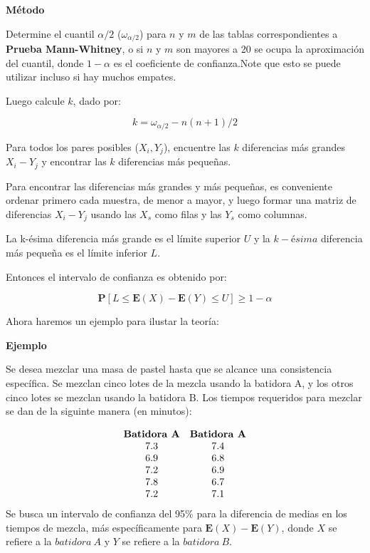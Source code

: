\documentclass[
  a4paper,
  oneside,
  openany]{book}
\begin{document}
\textbf{Método}

Determine el cuantil \(\alpha/2\) (\(\omega_{\alpha/2}\)) para \(n\) y \(m\) de las tablas correspondientes a \textbf{Prueba Mann-Whitney}, o si \(n\) y \(m\) son mayores a 20 se ocupa la aproximación del cuantil, donde \(1-\alpha\) es el coeficiente de confianza.Note que esto se puede utilizar incluso si hay muchos empates.

Luego calcule \(k\), dado por:

\[k= \omega_{\alpha/2}-n(n+1)/2\]

Para todos los pares posibles (\(X_{i},Y_{j}\)), encuentre las \(k\) diferencias más grandes \(X_{i}-Y_{j}\) y encontrar las \(k\) diferencias más pequeñas.

Para encontrar las diferencias más grandes y más pequeñas, es conveniente ordenar primero cada muestra, de menor a mayor, y luego formar una matriz de diferencias \(X_{i}-Y_{j}\) usando las \(X_s\) como filas y las \(Y_s\) como columnas.

La k-ésima diferencia más grande es el límite superior \(U\) y la \(k-ésima\) diferencia más pequeña es el límite inferior \(L\).

Entonces el intervalo de confianza es obtenido por:

\[\mathbf{P}[L\leq \mathbf{E}(X)-\mathbf{E}(Y)\leq U]\geq 1-\alpha\]

Ahora haremos un ejemplo para ilustar la teoría:

\textbf{Ejemplo}

Se desea mezclar una masa de pastel hasta que se alcance una consistencia específica. Se mezclan cinco lotes de la mezcla usando la batidora A, y los otros cinco lotes se mezclan usando la batidora B. Los tiempos requeridos para mezclar se dan de la siguinte manera (en minutos):

\[
\begin{array}{c c}
\textbf{Batidora A} & \textbf{Batidora A} \\
7.3 & 7.4 \\
6.9 & 6.8  \\
7.2 & 6.9 \\
7.8 & 6.7 \\
7.2 & 7.1 \\
\end{array}
\]
Se busca un intervalo de confianza del 95\% para la diferencia de medias en los tiempos de mezcla, más específicamente para \(\mathbf{E}(X)-\mathbf{E}(Y)\), donde \(X\) se refiere a la \(batidora\ A\) y \(Y\) se refiere a la \(batidora\ B\).
\end{document}
